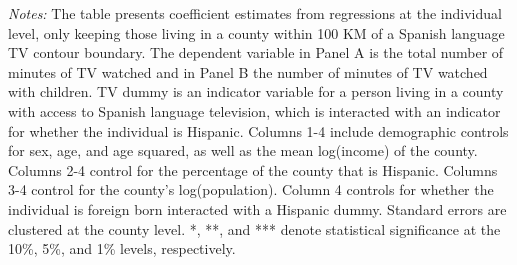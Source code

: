 \begin{table}[!htbp]
{\begin{threeparttable}
\begin{tablenotes}[flushleft]
				\item \textit{Notes:} The table presents coefficient estimates from regressions at the individual level, only keeping those living in a county within 100 KM of a Spanish language TV contour boundary. The dependent variable in Panel A is the total number of minutes of TV watched and in Panel B the number of minutes of TV watched with children. TV dummy is an indicator variable for a person living in a county with access to Spanish language television, which is interacted with an indicator for whether the individual is Hispanic. Columns 1-4 include demographic controls for sex, age, and age squared, as well as the mean log(income) of the county. Columns 2-4 control for the percentage of the county that is Hispanic. Columns 3-4 control for the county's log(population). Column 4 controls for whether the individual is foreign born interacted with a Hispanic dummy. Standard errors are clustered at the county level. *, **, and *** denote statistical significance at the 10\%, 5\%, and 1\% levels, respectively.
			\end{tablenotes}
		\end{threeparttable}
	}
\end{table}